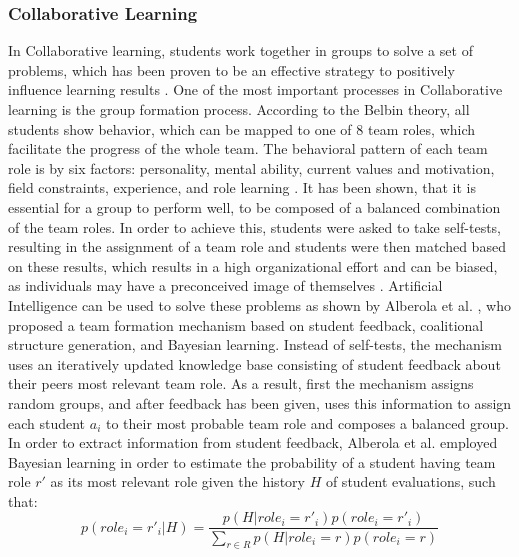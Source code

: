 \documentclass{Academic}
\begin{document}
    \subsubsection{Collaborative Learning}
    In Collaborative learning, students work together in groups to solve a set of problems, which has been proven to be an effective strategy to positively influence learning results \cite{holmes_artificial_2023}. One of the most important processes in Collaborative learning is the group formation process. According to the Belbin theory, all students show behavior, which can be mapped to one of 8 team roles, which facilitate the progress of the whole team. The behavioral pattern of each team role is by six factors: personality, mental ability, current values and motivation, field constraints, experience, and role learning \cite{alberola_artificial_2016}. It has been shown, that it is essential for a group to perform well, to be composed of a balanced combination of the team roles. In order to achieve this, students were asked to take self-tests, resulting in the assignment of a team role and students were then matched based on these results, which results in a high organizational effort and can be biased, as individuals may have a preconceived image of themselves \cite{alberola_artificial_2016}. Artificial Intelligence can be used to solve these problems as shown by Alberola et al. \cite{alberola_artificial_2016}, who proposed a team formation mechanism based on student feedback, coalitional structure generation, and Bayesian learning. Instead of self-tests, the mechanism uses an iteratively updated knowledge base consisting of student feedback about their peers most relevant team role. As a result, first the mechanism assigns random groups, and after feedback has been given, uses this information to assign each student $a_i$ to their most probable team role and composes a balanced group. In order to extract information from student feedback, Alberola et al. \cite{alberola_artificial_2016} employed Bayesian learning in order to estimate the probability of a student having team role $r'$ as its most relevant role given the history $H$ of student evaluations, such that:
    \begin{equation}
        p(role_i = r'_i|H) = \frac{p(H|role_i = r'_i)p(role_i=r'_i)}{\sum_{r \in R} p(H|role_i = r)p(role_i=r)}
    \end{equation}
\end{document}
